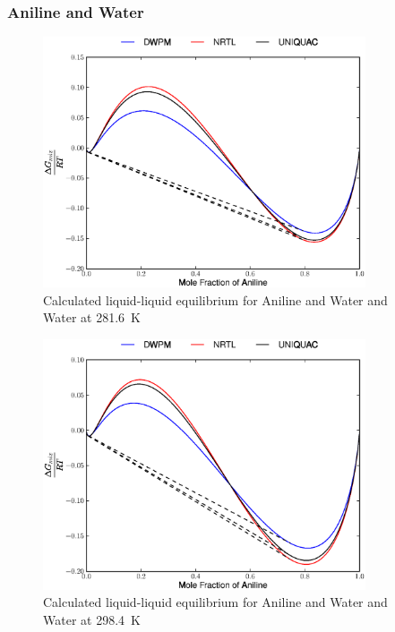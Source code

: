 \subsubsection*{Aniline and Water}

\begin{figure}[hp]
\centering
\includegraphics[width = 0.85\textwidth]{Results_Parts/BinaryParams/aniline-water/AllModelsGibbsPlots/T_281.6.eps}
\caption{Calculated liquid-liquid equilibrium for Aniline and Water and Water at 281.6~$\mathrm{K}$} 
\end{figure}

\begin{figure}[hp]
\centering
\includegraphics[width = 0.85\textwidth]{Results_Parts/BinaryParams/aniline-water/AllModelsGibbsPlots/T_298.4.eps}
\caption{Calculated liquid-liquid equilibrium for Aniline and Water and Water at 298.4~$\mathrm{K}$} 
\end{figure}

